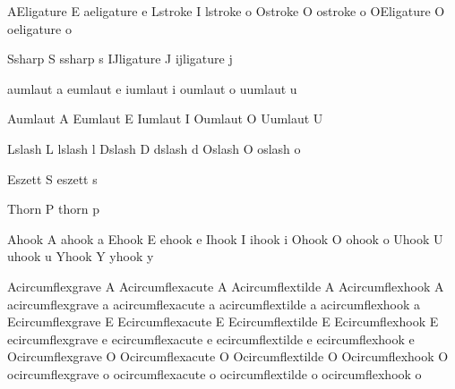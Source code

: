  \inherithandling AEligature E
  \inherithandling aeligature e
  \inherithandling Lstroke    I
  \inherithandling lstroke    o
  \inherithandling Ostroke    O
  \inherithandling ostroke    o
  \inherithandling OEligature O
  \inherithandling oeligature o

  \inherithandling Ssharp     S
  \inherithandling ssharp     s
  \inherithandling IJligature J
  \inherithandling ijligature j

  \inherithandling aumlaut a
  \inherithandling eumlaut e
  \inherithandling iumlaut i
  \inherithandling oumlaut o
  \inherithandling uumlaut u

  \inherithandling Aumlaut A
  \inherithandling Eumlaut E
  \inherithandling Iumlaut I
  \inherithandling Oumlaut O
  \inherithandling Uumlaut U

  \inherithandling Lslash L
  \inherithandling lslash l
  \inherithandling Dslash D
  \inherithandling dslash d
  \inherithandling Oslash O
  \inherithandling oslash o

  \inherithandling Eszett S
  \inherithandling eszett s

  \inherithandling Thorn P
  \inherithandling thorn p


  \inherithandling Ahook A
  \inherithandling ahook a
  \inherithandling Ehook E
  \inherithandling ehook e
  \inherithandling Ihook I
  \inherithandling ihook i
  \inherithandling Ohook O
  \inherithandling ohook o
  \inherithandling Uhook U
  \inherithandling uhook u
  \inherithandling Yhook Y
  \inherithandling yhook y

  \inherithandling Acircumflexgrave A
  \inherithandling Acircumflexacute A
  \inherithandling Acircumflextilde A
  \inherithandling Acircumflexhook  A
  \inherithandling acircumflexgrave a
  \inherithandling acircumflexacute a
  \inherithandling acircumflextilde a
  \inherithandling acircumflexhook  a
  \inherithandling Ecircumflexgrave E
  \inherithandling Ecircumflexacute E
  \inherithandling Ecircumflextilde E
  \inherithandling Ecircumflexhook  E
  \inherithandling ecircumflexgrave e
  \inherithandling ecircumflexacute e
  \inherithandling ecircumflextilde e
  \inherithandling ecircumflexhook  e
  \inherithandling Ocircumflexgrave O
  \inherithandling Ocircumflexacute O
  \inherithandling Ocircumflextilde O
  \inherithandling Ocircumflexhook  O
  \inherithandling ocircumflexgrave o
  \inherithandling ocircumflexacute o
  \inherithandling ocircumflextilde o
  \inherithandling ocircumflexhook  o

